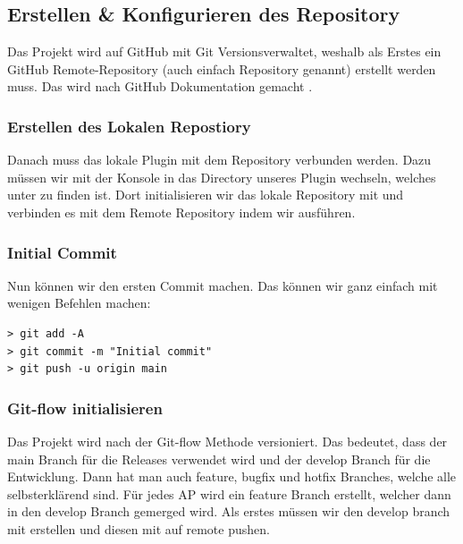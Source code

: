 \begin{minipage}{\textwidth}
  \subsection{Erstellen \& Konfigurieren des Repository}
  Das Projekt wird auf GitHub mit Git Versionsverwaltet, weshalb als Erstes ein GitHub Remote-Repository (auch einfach
  Repository genannt) erstellt werden muss. Das wird nach GitHub Dokumentation gemacht \cite{github_create_repo}.

  \subsubsection{Erstellen des Lokalen Repostiory}
  Danach muss das lokale Plugin mit dem Repository verbunden werden. Dazu müssen wir mit der Konsole in das Directory
  unseres Plugin wechseln, welches unter  zu finden ist. \newline
  Dort initialisieren wir das lokale Repository mit  und verbinden es mit dem Remote
  Repository indem wir  ausführen.

  \subsubsection{Initial Commit}
  Nun können wir den ersten Commit machen. Das können wir ganz einfach mit wenigen Befehlen machen:
  \begin{codebox}[]
    \begin{verbatim}
> git add -A
> git commit -m "Initial commit"
> git push -u origin main
    \end{verbatim}
  \end{codebox}

  \subsubsection{Git-flow initialisieren}
  Das Projekt wird nach der Git-flow Methode versioniert. Das bedeutet, dass der main Branch für die Releases
  verwendet wird und der develop Branch für die Entwicklung. \newline
  Dann hat man auch feature, bugfix und hotfix Branches, welche alle selbsterklärend sind. \newline
  Für jedes AP wird ein feature Branch erstellt, welcher dann in den develop Branch gemerged wird. \newline
  Als erstes müssen wir den develop branch mit  erstellen und diesen
  mit  auf remote pushen. \newline
\end{minipage}

